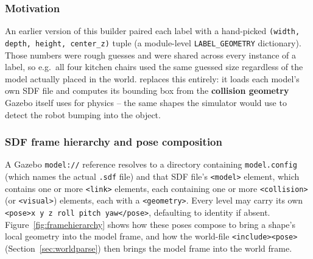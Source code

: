 \documentclass[11pt]{article}
\begin{document}
\subsubsection{Motivation}

An earlier version of this builder paired each label with a hand-picked
\texttt{(width, depth, height, center\_z)} tuple (a module-level
\texttt{LABEL\_GEOMETRY} dictionary). Those numbers were rough guesses and
were shared across every instance of a label, so e.g.\ all four kitchen
chairs used the same guessed size regardless of the model actually placed in
the world.  replaces
this entirely: it loads each model's own SDF file and computes its bounding
box from the \textbf{collision geometry} Gazebo itself uses for physics --
the same shapes the simulator would use to detect the robot bumping into the
object.

\subsubsection{SDF frame hierarchy and pose composition}

A Gazebo \texttt{model://} reference resolves to a directory containing
\texttt{model.config} (which names the actual \texttt{.sdf} file) and that
SDF file's \texttt{<model>} element, which contains one or more
\texttt{<link>} elements, each containing one or more \texttt{<collision>}
(or \texttt{<visual>}) elements, each with a \texttt{<geometry>}. Every level
may carry its own \texttt{<pose>x y z roll pitch yaw</pose>}, defaulting to
identity if absent. Figure~\ref{fig:framehierarchy} shows how these poses
compose to bring a shape's local geometry into the model frame, and how the
world-file \texttt{<include><pose>} (Section~\ref{sec:worldparse}) then
brings the model frame into the world frame.
\end{document}
